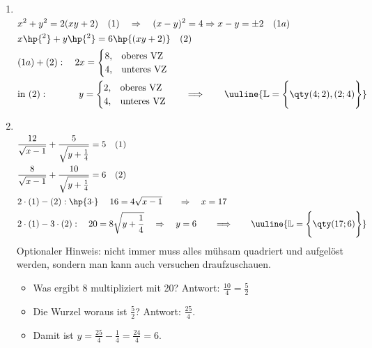 \begin{enumerate}[label=(\alph*)]
    \item $~$\\[-1.45 cm]
    \begin{align}
        &x^2+y^2=2(xy+2) \quad(1) \quad \Rightarrow \quad (x-y)^2 = 4 \Rightarrow x-y = \pm 2 \quad (1a)\\
        &x\hp{^2}+y\hp{^2} =6 \hp{(xy+2)} \quad(2)\\
        &(1a)+(2): \quad 2x = \begin{cases}
            8, & \text{oberes VZ} \\
            4, & \text{unteres VZ}
        \end{cases}\\
        &\text{in }(2): \qquad\quad\; y = \begin{cases}
            2, & \text{oberes VZ} \\
            4, & \text{unteres VZ}
        \end{cases} \qquad \Longrightarrow \qquad \uuline{\mathbb{L} = \Bigg\{\qty(4;2),(2;4)\Bigg\}}
    \end{align}
    \item $~$\\[-1.45cm]
    \begin{align}
        &\frac{12}{\sqrt{x-1}}+\frac{5}{\sqrt{y+\frac{1}{4}}}=5\quad (1)\\ 
        &\frac{8}{\sqrt{x-1}}+\frac{10}{\sqrt{y+\frac{1}{4}}}=6\quad(2)\\
        &2\cdot(1)-(2):\hp{3\cdot}\; \quad 16 = 4\sqrt{x-1}\;\;\; \quad \Rightarrow \quad x=17 \\
        &2\cdot(1)-3\cdot(2): \quad 20 = 8\sqrt{y+\frac{1}{4}} \quad \Rightarrow \quad y=6 \qquad \Longrightarrow \qquad \uuline{\mathbb{L} = \Bigg\{\qty(17;6)\Bigg\}}
    \end{align} 
    Optionaler Hinweis: nicht immer muss alles mühsam quadriert und aufgelöst werden, sondern man kann auch versuchen draufzuschauen. 
    \begin{itemize}
        \item Was ergibt 8 multipliziert mit 20? Antwort: $\textstyle\frac{10}{4}=\frac{5}{2}$
        \item Die Wurzel woraus ist $\textstyle\frac{5}{2}$? Antwort: $\textstyle\frac{25}{4}$. 
        \item Damit ist $y = \frac{25}{4}-\frac{1}{4}= \frac{24}{4} = 6$.
    \end{itemize}
    \vspace{3mm}

\end{enumerate}
